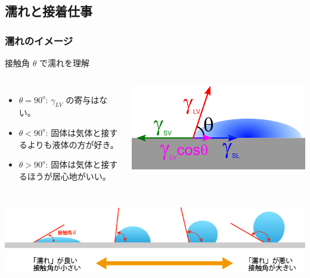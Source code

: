 \documentclass[unicode,12pt]{beamer}%
\begin{document}
\subsection{濡れと接着仕事}
\begin{frame}
	\frametitle{濡れのイメージ}
	
		\begin{block}{接触角 $\theta$ で濡れを理解}
			\begin{columns}[c, onlytextwidth]
					\begin{itemize}
						\item $\theta = 90^{o}$: $\gamma_{LV}$ の寄与はない。
						\item $\theta < 90^{o}$: 固体は気体と接するよりも液体の方が好き。
						\item $\theta > 90^{o}$: 固体は気体と接するほうが居心地がいい。
					\end{itemize}
				\centering
				\includegraphics[width=\textwidth]{young.png}
			\end{columns}
		\end{block}
	\vspace{5mm}
	\centering
			\includegraphics[width=\textwidth]{wetting.png}
\end{frame}
\end{document}
